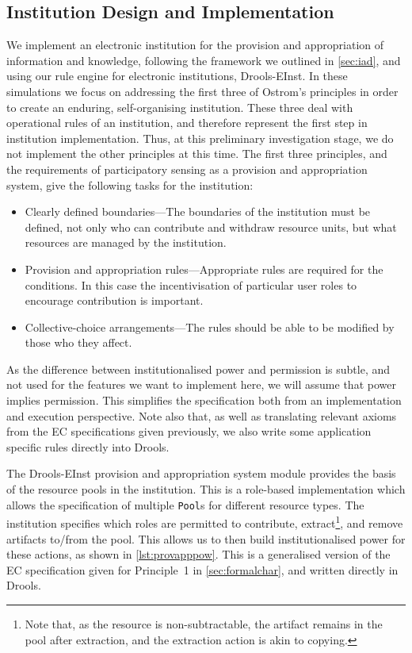 \subsection{Institution Design and Implementation}

We implement an electronic institution for the provision and appropriation of
information and knowledge, following the framework we outlined in
\autoref{sec:iad}, and using our rule engine for electronic institutions,
Drools-EInst. In these simulations we focus on addressing the first three of
Ostrom's principles in order to create an enduring, self-organising
institution. 
These three deal with operational rules of an institution, and therefore represent the first step in institution implementation. Thus, at this preliminary investigation stage, we do not implement the other principles at this time.
The first three principles, and the requirements of participatory sensing as a provision and appropriation system, give the following tasks for the institution:

\begin{itemize}
\item Clearly defined boundaries---The boundaries of the institution must be defined, not only who can contribute and withdraw resource units, but what resources are managed by the institution.
\item Provision and appropriation rules---Appropriate rules are required for the conditions. In this case the incentivisation of particular user roles to encourage contribution is important.
\item Collective-choice arrangements---The rules should be able to be modified by those who they affect.
\end{itemize}

As the difference between institutionalised power and permission is subtle, and not used for the features we want to implement here, we will assume that power implies permission. This simplifies the specification both from an implementation and execution perspective.
Note also that, as well as translating relevant axioms from the \ac{EC} specifications given previously, we also write some application specific rules directly into Drools.

The Drools-EInst provision and appropriation system module provides the basis
of the resource pools in the institution. This is a role-based implementation
which allows the specification of multiple \texttt{Pool}s for different
resource types. The institution specifies which roles are permitted to contribute,
extract\footnote{Note that, as the resource is non-subtractable, the artifact remains in the pool after extraction, and the extraction action is akin to copying.}, and remove artifacts to/from the pool. This allows us to then build
institutionalised power for these actions, as shown in \autoref{lst:provapppow}. This is a generalised version of the EC specification given for Principle~1 in \autoref{sec:formalchar}, and written directly in Drools.

